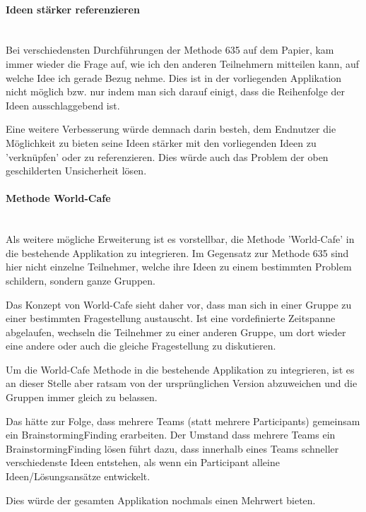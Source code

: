 \paragraph*{Ideen stärker referenzieren}~\\
Bei verschiedensten Durchführungen der Methode 635 auf dem Papier, kam immer wieder die Frage auf, wie ich den anderen Teilnehmern mitteilen kann, auf welche Idee ich gerade Bezug nehme. Dies ist in der vorliegenden Applikation nicht möglich bzw. nur indem man sich darauf einigt, dass die Reihenfolge der Ideen ausschlaggebend ist.

Eine weitere Verbesserung würde demnach darin besteh, dem Endnutzer die Möglichkeit zu bieten seine Ideen stärker mit den vorliegenden Ideen zu 'verknüpfen' oder zu referenzieren. Dies würde auch das Problem der oben geschilderten Unsicherheit lösen.

\paragraph*{Methode World-Cafe}~\\
Als weitere mögliche Erweiterung ist es vorstellbar, die Methode 'World-Cafe' \cite{world-cafe} in die bestehende Applikation zu integrieren. Im Gegensatz zur Methode 635 sind hier nicht einzelne Teilnehmer, welche ihre Ideen zu einem bestimmten Problem schildern, sondern ganze Gruppen.

Das Konzept von World-Cafe sieht daher vor, dass man sich in einer Gruppe zu einer bestimmten Fragestellung austauscht. Ist eine vordefinierte Zeitspanne abgelaufen, wechseln die Teilnehmer zu einer anderen Gruppe, um dort wieder eine andere oder auch die gleiche Fragestellung zu diskutieren. 

Um die World-Cafe Methode in die bestehende Applikation zu integrieren, ist es an dieser Stelle aber ratsam von der ursprünglichen Version abzuweichen und die Gruppen immer gleich zu belassen. 

Das hätte zur Folge, dass mehrere Teams (statt mehrere Participants) gemeinsam ein BrainstormingFinding erarbeiten. Der Umstand dass mehrere Teams ein BrainstormingFinding lösen führt dazu, dass innerhalb eines Teams schneller verschiedenste Ideen entstehen, als wenn ein Participant alleine Ideen/Lösungsansätze entwickelt. 

Dies würde der gesamten Applikation nochmals einen Mehrwert bieten. 
